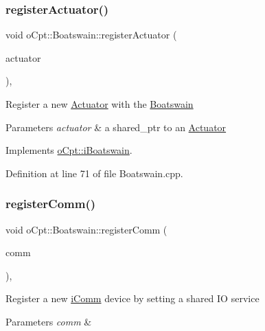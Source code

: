 \subsubsection{\texorpdfstring{register\+Actuator()}{registerActuator()}}
{\footnotesize\ttfamily void o\+Cpt\+::\+Boatswain\+::register\+Actuator (\begin{DoxyParamCaption}\item[{\hyperlink{classo_cpt_1_1i_actuator_a35847799558e92bb84fb6c71de772cac}{i\+Actuator\+::ptr}}]{actuator }\end{DoxyParamCaption})\hspace{0.3cm}{\ttfamily [override]}, {\ttfamily [virtual]}}

Register a new \hyperlink{classo_cpt_1_1_actuator}{Actuator} with the \hyperlink{classo_cpt_1_1_boatswain}{Boatswain} 
\begin{DoxyParams}{Parameters}
{\em actuator} & a shared\+\_\+ptr to an \hyperlink{classo_cpt_1_1_actuator}{Actuator} \\
\hline
\end{DoxyParams}


Implements \hyperlink{classo_cpt_1_1i_boatswain_a7915584ee17a28b1fc506a8968e27387}{o\+Cpt\+::i\+Boatswain}.



Definition at line 71 of file Boatswain.\+cpp.

\hypertarget{classo_cpt_1_1_boatswain_a7abff24ce1f199690a4890793ff8c23c}{}\label{classo_cpt_1_1_boatswain_a7abff24ce1f199690a4890793ff8c23c} 
\subsubsection{\texorpdfstring{register\+Comm()}{registerComm()}}
{\footnotesize\ttfamily void o\+Cpt\+::\+Boatswain\+::register\+Comm (\begin{DoxyParamCaption}\item[{\hyperlink{classo_cpt_1_1i_comm_af0c655f143251b7d03fcd98f89637228}{i\+Comm\+::ptr}}]{comm }\end{DoxyParamCaption})\hspace{0.3cm}{\ttfamily [override]}, {\ttfamily [virtual]}}

Register a new \hyperlink{classo_cpt_1_1i_comm}{i\+Comm} device by setting a shared IO service 
\begin{DoxyParams}{Parameters}
{\em comm} & \\
\hline
\end{DoxyParams}


